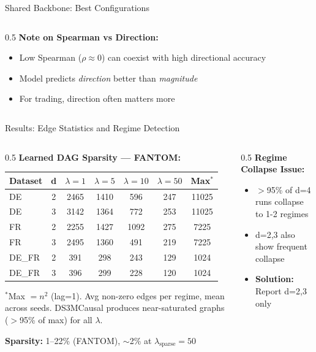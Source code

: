 \documentclass[aspectratio=169]{beamer}
\begin{document}
\begin{frame}{Shared Backbone: Best Configurations}
\begin{columns}
\begin{column}{0.5\textwidth}
\textbf{Note on Spearman vs Direction:}
\begin{itemize}
    \item Low Spearman ($\rho \approx 0$) can coexist with high directional accuracy
    \item Model predicts \textit{direction} better than \textit{magnitude}
    \item For trading, direction often matters more
\end{itemize}
\end{column}
\end{columns}
\end{frame}

\begin{frame}{Results: Edge Statistics and Regime Detection}
\begin{columns}
\begin{column}{0.5\textwidth}
\textbf{Learned DAG Sparsity --- FANTOM:}
\begin{table}
\scriptsize
\begin{tabular}{l|c|cccc|c}
\toprule
\textbf{Dataset} & \textbf{d} & $\lambda{=}1$ & $\lambda{=}5$ & $\lambda{=}10$ & $\lambda{=}50$ & \textbf{Max}$^*$ \\
\midrule
DE & 2 & 2465 & 1410 & 596 & 247 & 11025 \\
DE & 3 & 3142 & 1364 & 772 & 253 & 11025 \\
FR & 2 & 2255 & 1427 & 1092 & 275 & 7225 \\
FR & 3 & 2495 & 1360 & 491 & 219 & 7225 \\
DE\_FR & 2 & 391 & 298 & 243 & 129 & 1024 \\
DE\_FR & 3 & 396 & 299 & 228 & 120 & 1024 \\
\bottomrule
\end{tabular}
\end{table}
{\tiny $^*$Max $= n^2$ (lag=1). Avg non-zero edges per regime, mean across seeds.}
{\tiny DS3MCausal produces near-saturated graphs ($>$95\% of max) for all $\lambda$.}

\textbf{Sparsity:} 1--22\% (FANTOM), ${\sim}$2\% at $\lambda_{\text{sparse}}{=}50$
\end{column}

\begin{column}{0.5\textwidth}
\textbf{Regime Collapse Issue:}
\begin{itemize}
    \item $>$95\% of d=4 runs collapse to 1-2 regimes
    \item d=2,3 also show frequent collapse
    \item \textbf{Solution:} Report d=2,3 only
\end{itemize}


\end{column}
\end{columns}
\end{frame}
\end{document}
